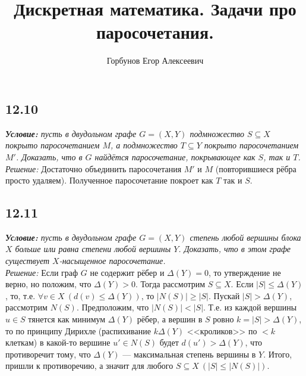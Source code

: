 
\title{Дискретная математика. Задачи про паросочетания.}
\author{Горбунов Егор Алексеевич}


\maketitle

\subsection*{12.10}
\textit{\textbf{Условие:} пусть в двудольном графе $G=(X,Y)$ подмножество $S\subseteq X$ покрыто паросочетанием $M$, а подмножество $T \subseteq Y$ покрыто паросочетанием $M'$. Доказать, что в $G$ найдётся паросочетание, покрывающее как $S$, так и $T$.}\\
\textit{Решение:} Достаточно объединить паросочетания $M'$ и $M$ (повторившиеся рёбра просто удаляем). Полученное паросочетание покроет как $T$ так и $S$. \xqed
\subsection*{12.11}
\textit{\textbf{Условие:} пусть в двудольном графе $G=(X,Y)$ степень любой вершины блока $X$ больше или равна степени любой вершины $Y$. Доказать, что в этом графе существует $X$-насыщенное паросочетание.}\\
\textit{Решение:} Если граф $G$ не содержит рёбер и $\Delta(Y)=0$, то утверждение не верно, но положим, что $\Delta(Y)>0$. Тогда рассмотрим $S \subseteq X$. Если $|S| \leq \Delta(Y)$, то, т.е. $\forall v \in X\ (d(v) \leq \Delta(Y))$, то
$|N(S)| \geq |S|$. Пускай $|S| > \Delta(Y)$, рассмотрим $N(S)$. Предположим, что $|N(S)| < |S|$. Т.е. из каждой вершины $u \in S$ тянется как минимум $\Delta(Y)$ рёбер, а вершин в $S$ ровно $k = |S| > \Delta(Y)$, то по принципу Дирихле (распихивание $k\Delta(Y)$ <<кроликов>> по $< k$ клеткам) в какой-то вершине $u'\in N(S)$ будет $d(u') > \Delta(Y)$, что противоречит тому, что $\Delta(Y)$ --- максимальная степень вершины в $Y$. Итого, пришли к противоречию, а значит для любого $S\subseteq X\ (|S| \leq |N(S)|)$. \xqed
